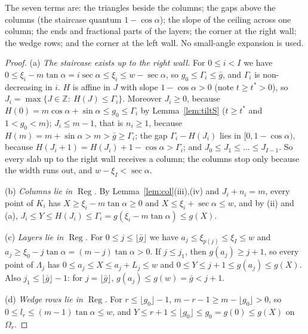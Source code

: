 \documentclass[11pt]{amsart}
\newcommand{\Z}{\mathbb Z}
\newcommand{\Reg}{\operatorname{Reg}}
\newcommand{\ca}{\cos\alpha}
\newcommand{\sa}{\sin\alpha}
\newcommand{\ta}{\tan\alpha}
\newcommand{\se}{\sec\alpha}
\theoremstyle{definition}
\theoremstyle{remark}
\numberwithin{equation}{section}
\begin{document}
The seven terms are: the triangles beside the columns; the gaps above the columns (the staircase quantum $1-\ca$);
the slope of the ceiling across one column; the ends and fractional parts of the layers; the corner at the right
wall; the wedge rows; and the corner at the left wall. No small-angle expansion is used.

\begin{proof}
(a) \emph{The staircase exists up to the right wall.} For $0\le i<I$ we have
$0\le\xi_i-m\ta=i\se\le\xi_i\le w-\se$, so $g_0\le\Gamma_i\le\bar g$, and $\Gamma_i$ is non-decreasing in $i$. $H$ is
affine in $J$ with slope $1-\ca>0$ (note $t\ge t^*>0$), so $J_i=\max\{J\in\Z:\ H(J)\le\Gamma_i\}$. Moreover
$J_i\ge0$, because $H(0)=m\ca+\sa\le g_0\le\Gamma_i$ by Lemma~\ref{lem:tiltS} ($t\ge t^*$ and $1<g_0<m$);
$J_i\le m-1$, that is $n_i\ge1$, because $H(m)=m+\sa>m>\bar g\ge\Gamma_i$; the gap $\Gamma_i-H(J_i)$ lies in
$[0,1-\ca)$, because $H(J_i+1)=H(J_i)+1-\ca>\Gamma_i$; and $J_0\le J_1\le\dots\le J_{I-1}$. So every slab up to the
right wall receives a column; the columns stop only because the width runs out, and $w-\xi_I<\se$.

(b) \emph{Columns lie in $\Reg$.} By Lemma~\ref{lem:col}(iii),(iv) and $J_i+n_i=m$, every point of $K_i$ has
$X\ge\xi_i-m\ta\ge0$ and $X\le\xi_i+\se\le w$, and by (ii) and (a),
$J_i\le Y\le H(J_i)\le\Gamma_i=g(\xi_i-m\ta)\le g(X)$.

(c) \emph{Layers lie in $\Reg$.} For $0\le j\le\lfloor\bar g\rfloor$ we have $a_j\le\xi_{p(j)}\le\xi_I\le w$ and
$a_j\ge\xi_0-j\ta=(m-j)\ta>0$. If $j\le j_1$, then $g(a_j)\ge j+1$, so every point of $\Lambda_j$ has
$0\le a_j\le X\le a_j+L_j\le w$ and $0\le Y\le j+1\le g(a_j)\le g(X)$. Also $j_1\le\lfloor\bar g\rfloor-1$: for
$j=\lfloor\bar g\rfloor$, $g(a_j)\le g(w)=\bar g<j+1$.

(d) \emph{Wedge rows lie in $\Reg$.} For $r\le\lfloor g_0\rfloor-1$, $m-r-1\ge m-\lfloor g_0\rfloor>0$, so
$0\le l_r\le(m-1)\ta\le w$, and $Y\le r+1\le\lfloor g_0\rfloor\le g_0=g(0)\le g(X)$ on $\Omega_r$.


\end{proof}
\end{document}
